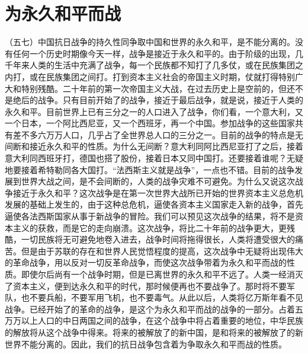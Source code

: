\section{为永久和平而战}

（五七）中国抗日战争的持久性同争取中国和世界的永久和平，是不能分离的。没有任何一个历史时期像今天一样，战争是接近于永久和平的。由于阶级的出现，几千年来人类的生活中充满了战争，每一个民族都不知打了几多仗，或在民族集团之内打，或在民族集团之间打。打到资本主义社会的帝国主义时期，仗就打得特别广大和特别残酷。二十年前的第一次帝国主义大战，在过去历史上是空前的，但还不是绝后的战争。只有目前开始了的战争，接近于最后战争，就是说，接近于人类的永久和平。目前世界上已有三分之一的人口进入了战争，你们看，一个意大利，又一个日本，一个阿比西尼亚，又一个西班牙，再一个中国。参加战争的这些国家共有差不多六万万人口，几乎占了全世界总人口的三分之一。目前的战争的特点是无间断和接近永久和平的性质。为什么无间断？意大利同阿比西尼亚打了之后，接着意大利同西班牙打，德国也搭了股份，接着日本又同中国打。还要接着谁呢？无疑地要接着希特勒同各大国打。“法西斯主义就是战争”，一点也不错。目前的战争发展到世界大战之间，是不会间断的，人类的战争灾难不可避免。为什么又说这次战争接近于永久和平？这次战争是在第一次世界大战所已开始的世界资本主义总危机发展的基础上发生的，由于这种总危机，逼使各资本主义国家走入新的战争，首先逼使各法西斯国家从事于新战争的冒险。我们可以预见这次战争的结果，将不是资本主义的获救，而是它的走向崩溃。这次战争，将比二十年前的战争更大，更残酷，一切民族将无可避免地卷入进去，战争时间将拖得很长，人类将遭受很大的痛苦。但是由于苏联的存在和世界人民觉悟程度的提高，这次战争中无疑将出现伟大的革命战争，用以反对一切反革命战争，而使这次战争带着为永久和平而战的性质。即使尔后尚有一个战争时期，但是已离世界的永久和平不远了。人类一经消灭了资本主义，便到达永久和平的时代，那时候便再也不要战争了。那时将不要军队，也不要兵船，不要军用飞机，也不要毒气。从此以后，人类将亿万斯年看不见战争。已经开始了的革命的战争，是这个为永久和平而战的战争的一部分。占着五万万以上人口的中日两国之间的战争，在这个战争中将占着重要的地位，中华民族的解放将从这个战争中得来。将来的被解放了的新中国，是和将来的被解放了的新世界不能分离的。因此，我们的抗日战争包含着为争取永久和平而战的性质。

